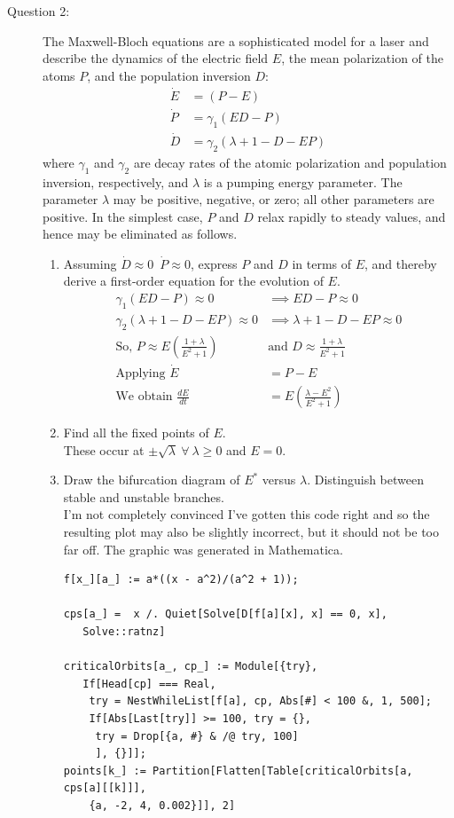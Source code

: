 \documentclass[letterpaper,10pt]{article}
\begin{document}
\begin{description}
\item[Question 2:]
The Maxwell-Bloch equations are a sophisticated model for a laser and describe the dynamics of the electric field $E$, the mean polarization of the atoms $P$, and the population inversion $D$:
\begin{align*}
\dot{E} &= (P-E) \\
\dot{P} &= \gamma_1(ED-P) \\
\dot{D} &= \gamma_2(\lambda+1-D-EP)
\end{align*}
where $\gamma_1$ and $\gamma_2$ are decay rates of the atomic polarization and population inversion, respectively, and $\lambda$ is a pumping energy parameter.  The parameter $\lambda$ may be positive, negative, or zero; all other parameters are positive.  In the simplest case, $P$ and $D$ relax rapidly to steady values, and hence may be eliminated as follows.
\begin{enumerate}
\item Assuming $\dot{D}\approx 0$\ $\dot{P}\approx 0$, express $P$ and $D$ in terms of $E$, and thereby derive a first-order equation for the evolution of $E$.
\begin{align*}
	\gamma_1(ED-P)\approx0 &\implies ED-P\approx0 \\
	\gamma_2(\lambda+1-D-EP)\approx0 &\implies \lambda+1-D-EP\approx0 \\
	\mbox{So,\ } P\approx E\left(\frac{1+\lambda}{E^2+1}\right) &\mbox{and\ } D\approx\frac{1+\lambda}{E^2+1} \\
	\mbox{Applying\ } \dot{E} &= P-E \\ 
	\mbox{We obtain\ } \frac{dE}{dt} &= E\left(\frac{\lambda-E^2}{E^2+1}\right)
\end{align*}
\item Find all the fixed points of $E$.  \\ These occur at $\pm\sqrt{\lambda}\ \forall\ \lambda\geq0$ and $E=0$.
\item Draw the bifurcation diagram of $E^*$ versus $\lambda$.  Distinguish between stable and unstable branches. \\
  I'm not completely convinced I've gotten this code right and so the resulting plot may also be slightly incorrect, but it should not be too far off.  The graphic was generated in Mathematica.
  \begin{verbatim}
f[x_][a_] := a*((x - a^2)/(a^2 + 1));

cps[a_] =  x /. Quiet[Solve[D[f[a][x], x] == 0, x], 
   Solve::ratnz]

criticalOrbits[a_, cp_] := Module[{try},
   If[Head[cp] === Real,
    try = NestWhileList[f[a], cp, Abs[#] < 100 &, 1, 500];
    If[Abs[Last[try]] >= 100, try = {},
     try = Drop[{a, #} & /@ try, 100]
     ], {}]];
points[k_] := Partition[Flatten[Table[criticalOrbits[a, cps[a][[k]]],
    {a, -2, 4, 0.002}]], 2]


\end{verbatim}
\end{enumerate}
\end{description}
\end{document}
